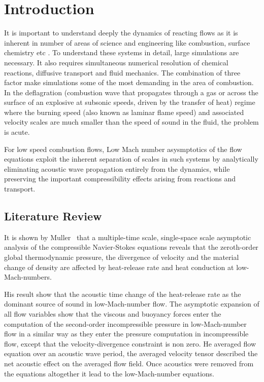 \chapter{Introduction}

It is important to understand deeply the dynamics of reacting flows as it is inherent in number of areas of science and engineering like combustion, surface chemistry etc . To understand these systems in detail, large simulations are necessary. It also requires simultaneous numerical resolution of chemical reactions, diffusive
transport and fluid mechanics. The combination of three factor make simulations some of the most demanding in the area of combustion. In the deflagration (combustion wave that propagates through a gas or across the surface of an explosive at subsonic speeds, driven by the transfer of heat) regime where the burning speed (also known as laminar flame speed) and associated velocity scales are much smaller than the speed of sound in the fluid, the problem is acute.

\bigskip
\noindent For low speed combustion flows, Low Mach number asysmptotics of the flow equations exploit the inherent separation of scales in such systems by analytically eliminating acoustic wave propagation entirely from the dynamics, while preserving the important compressibility effects arising from reactions and transport.
\section{Literature Review}
It is shown by Muller~\cite{Muller} that a multiple-time scale, single-space scale asymptotic analysis of the compressible Navier-Stokes equations reveals that the zeroth-order global thermodynamic pressure, the divergence of velocity and the material change of density are affected by heat-release rate and heat conduction at low-Mach-numbers.

\bigskip 
\noindent His result show that the acoustic time change of the heat-release rate as the dominant source of sound in low-Mach-number flow. The asymptotic expansion of all flow variables show that the viscous and buoyancy forces enter the computation of the second-order incompressible pressure in low-Mach-number flow in a similar way as they enter the pressure computation in incompressible flow, except that the
velocity-divergence constraint is non zero. He averaged flow equation over an acoustic wave period, the averaged velocity tensor described the net acoustic effect on the averaged flow field. Once acoustics were removed from the equations altogether it lead to the low-Mach-number equations.

